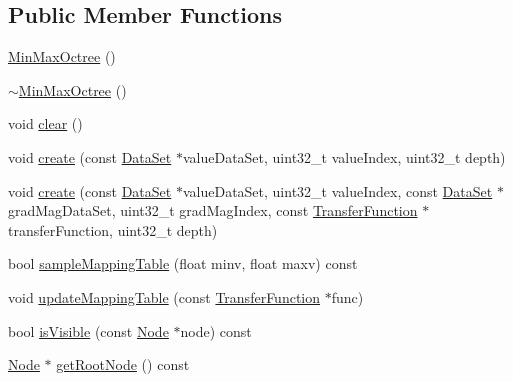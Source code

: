 \subsection*{\-Public \-Member \-Functions}
\begin{DoxyCompactItemize}
\item 
\hyperlink{class_verdi_1_1_min_max_octree_a4f35364642eae968b40d45dab3a45847}{\-Min\-Max\-Octree} ()
\item 
\hyperlink{class_verdi_1_1_min_max_octree_af5ff8bee7aa713ac1df1002a046d31e9}{$\sim$\-Min\-Max\-Octree} ()
\item 
void \hyperlink{class_verdi_1_1_min_max_octree_a077f66fafa92226035a35a65087a56cd}{clear} ()
\item 
void \hyperlink{class_verdi_1_1_min_max_octree_a939114366e7c2d07c31fb9df50943273}{create} (const \hyperlink{class_verdi_1_1_data_set}{\-Data\-Set} $\ast$value\-Data\-Set, uint32\-\_\-t value\-Index, uint32\-\_\-t depth)
\item 
void \hyperlink{class_verdi_1_1_min_max_octree_a11bfb801dbe29ff9aa292ad79b8ec3f0}{create} (const \hyperlink{class_verdi_1_1_data_set}{\-Data\-Set} $\ast$value\-Data\-Set, uint32\-\_\-t value\-Index, const \hyperlink{class_verdi_1_1_data_set}{\-Data\-Set} $\ast$grad\-Mag\-Data\-Set, uint32\-\_\-t grad\-Mag\-Index, const \hyperlink{class_verdi_1_1_transfer_function}{\-Transfer\-Function} $\ast$transfer\-Function, uint32\-\_\-t depth)
\item 
bool \hyperlink{class_verdi_1_1_min_max_octree_a9ba1bcc4cc5640a7063ee0387a8e0e15}{sample\-Mapping\-Table} (float minv, float maxv) const 
\item 
void \hyperlink{class_verdi_1_1_min_max_octree_a919a1f37fe483f62bc4f998fe77c221b}{update\-Mapping\-Table} (const \hyperlink{class_verdi_1_1_transfer_function}{\-Transfer\-Function} $\ast$func)
\item 
bool \hyperlink{class_verdi_1_1_min_max_octree_a1c89f597df644f03aeb780914a1570d6}{is\-Visible} (const \hyperlink{class_verdi_1_1_min_max_octree_1_1_node}{\-Node} $\ast$node) const 
\item 
\hyperlink{class_verdi_1_1_min_max_octree_1_1_node}{\-Node} $\ast$ \hyperlink{class_verdi_1_1_min_max_octree_ab1f77097e425d06168c22ed0105b6ff6}{get\-Root\-Node} () const 
\end{DoxyCompactItemize}

